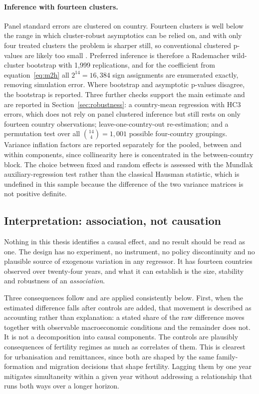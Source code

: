 \paragraph{Inference with fourteen clusters.} Panel standard errors are clustered on country. Fourteen clusters is well below the range in which cluster-robust asymptotics can be relied on, and with only four treated clusters the problem is sharper still, so conventional clustered p-values are likely too small \parencite{cameron2008,mackinnon2018}. Preferred inference is therefore a Rademacher wild-cluster bootstrap with 1{,}999 replications, and for the coefficient from equation~\eqref{eq:m2h} all $2^{14}=16{,}384$ sign assignments are enumerated exactly, removing simulation error. Where bootstrap and asymptotic p-values disagree, the bootstrap is reported. Three further checks support the main estimate and are reported in Section~\ref{sec:robustness}: a country-mean regression with HC3 errors, which does not rely on panel clustered inference but still rests on only fourteen country observations; leave-one-country-out re-estimation; and a permutation test over all $\binom{14}{4}=1{,}001$ possible four-country groupings. Variance inflation factors are reported separately for the pooled, between and within components, since collinearity here is concentrated in the between-country block. The choice between fixed and random effects is assessed with the Mundlak auxiliary-regression test rather than the classical Hausman statistic, which is undefined in this sample because the difference of the two variance matrices is not positive definite.

\subsection{Interpretation: association, not causation}
\label{sec:interpretation}

Nothing in this thesis identifies a causal effect, and no result should be read as one. The design has no experiment, no instrument, no policy discontinuity and no plausible source of exogenous variation in any regressor. It has fourteen countries observed over twenty-four years, and what it can establish is the size, stability and robustness of an \emph{association}.

Three consequences follow and are applied consistently below. First, when the estimated difference falls after controls are added, that movement is described as accounting rather than explanation: a stated share of the raw difference moves together with observable macroeconomic conditions and the remainder does not. It is not a decomposition into causal components. The controls are plausibly consequences of fertility regimes as much as correlates of them. This is clearest for urbanisation and remittances, since both are shaped by the same family-formation and migration decisions that shape fertility. Lagging them by one year mitigates simultaneity within a given year without addressing a relationship that runs both ways over a longer horizon.

